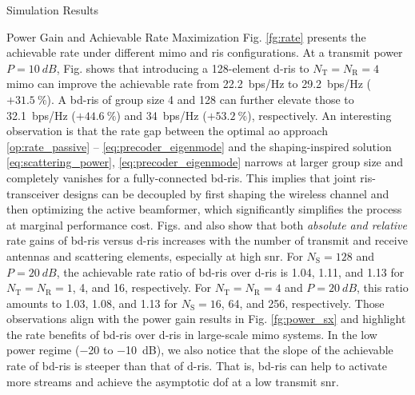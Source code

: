 \documentclass[journal]{IEEEtran}
\begin{document}
\begin{section}{Simulation Results}
\begin{subsection}{Power Gain and Achievable Rate Maximization}
		Fig. \ref{fg:rate} presents the achievable rate under different \gls{mimo} and \gls{ris} configurations.
		At a transmit power $P = \qty{10}{dB}$, Fig.  shows that introducing a 128-element \gls{d}-\gls{ris} to $N_\mathrm{T}=N_\mathrm{R}=4$ \gls{mimo} can improve the achievable rate from \qty{22.2}{bps/Hz} to \qty{29.2}{bps/Hz} ($+\qty{31.5}{\percent}$).
		A \gls{bd}-\gls{ris} of group size 4 and 128 can further elevate those to \qty{32.1}{bps/Hz} ($+\qty{44.6}{\percent}$) and \qty{34}{bps/Hz}  ($+\qty{53.2}{\percent}$), respectively.
		An interesting observation is that the rate gap between the optimal \gls{ao} approach \eqref{op:rate_passive} -- \eqref{eq:precoder_eigenmode} and the shaping-inspired solution \eqref{eq:scattering_power}, \eqref{eq:precoder_eigenmode} narrows at larger group size and completely vanishes for a fully-connected \gls{bd}-\gls{ris}.
		This implies that joint \gls{ris}-transceiver designs can be decoupled by first shaping the wireless channel and then optimizing the active beamformer, which significantly simplifies the process at marginal performance cost.
		Figs.  and  also show that both \emph{absolute and relative} rate gains of \gls{bd}-\gls{ris} versus \gls{d}-\gls{ris}
		increases with the number of transmit and receive antennas and scattering elements, especially at high \gls{snr}.
		For $N_\mathrm{S}=128$ and $P = \qty{20}{dB}$,
		the achievable rate ratio of \gls{bd}-\gls{ris} over \gls{d}-\gls{ris} is \num{1.04}, \num{1.11}, and \num{1.13} for $N_\mathrm{T}=N_\mathrm{R}=1$, \num{4}, and \num{16}, respectively.
		For $N_\mathrm{T}=N_\mathrm{R}=4$ and $P = \qty{20}{dB}$, this ratio amounts to \num{1.03}, \num{1.08}, and \num{1.13} for $N_\mathrm{S}=16$, \num{64}, and \num{256}, respectively.
		Those observations align with the power gain results in Fig. \ref{fg:power_sx} and highlight the rate benefits of \gls{bd}-\gls{ris} over \gls{d}-\gls{ris} in large-scale \gls{mimo} systems.
		In the low power regime (\num{-20} to \qty{-10}{dB}), we also notice that the slope of the achievable rate of \gls{bd}-\gls{ris} is steeper than that of \gls{d}-\gls{ris}.
		That is, \gls{bd}-\gls{ris} can help to activate more streams and achieve the asymptotic \gls{dof} at a low transmit \gls{snr}.

\end{subsection}
\end{section}
\end{document}
